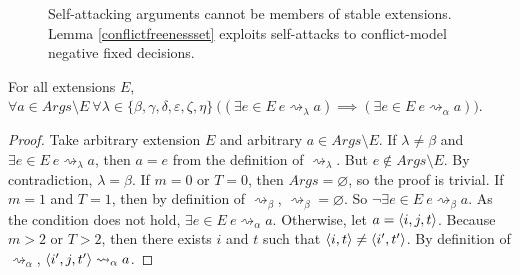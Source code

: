 \begin{figure}[H]
	\centering
	\caption{Self-attacking arguments cannot be members of stable extensions. Lemma \ref{conflictfreenessset} exploits self-attacks to conflict-model negative fixed decisions.}
\end{figure}

\begin{lemma}
	\label{intervalstabilitydependence}
	For all extensions $E$, $\forall a\in Args\setminus E\ \forall\lambda\in\{\beta,\gamma,\delta,\varepsilon,\zeta,\eta\}\ \big((\exists e\in E\ e\rightsquigarrow_\lambda a)\implies(\exists e\in E\ e\rightsquigarrow_\alpha a)\big)$.
	
	\begin{proof}
		Take arbitrary extension $E$ and arbitrary $a\in Args\setminus E$. If $\lambda\neq\beta$ and $\exists e\in E\ e\rightsquigarrow_\lambda a$, then $a=e$ from the definition of $\rightsquigarrow_\lambda$. But $e\not\in Args\setminus E$. By contradiction, $\lambda=\beta$.
		\linespace
		If $m=0$ or $T=0$, then $Args=\varnothing$, so the proof is trivial.
		\linespace
		If $m=1$ and $T=1$, then by definition of $\rightsquigarrow_\beta$, $\rightsquigarrow_\beta=\varnothing$. So $\neg\exists e\in E\ e\rightsquigarrow_\beta a$. As the condition does not hold, $\exists e\in E\ e\rightsquigarrow_\alpha a$.
		\linespace
		Otherwise, let $a=\langle{i},{j},{t}\rangle$. Because $m>2$ or $T>2$, then there exists $i$ and $t$ such that $\langle{i},{t}\rangle\neq\langle{i'},{t'}\rangle$. By definition of $\rightsquigarrow_\alpha$, $\langle{i'},{j},{t'}\rangle\rightsquigarrow_\alpha a$.
	\end{proof}
\end{lemma}

